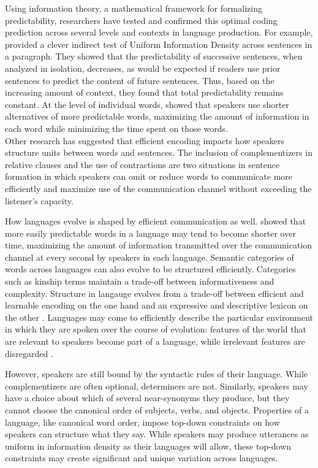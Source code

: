 \documentclass[entropy,article,submit,moreauthors,pdftex]{mdpi}
\begin{document}
Using information theory, a mathematical framework for formalizing
predictability, researchers have tested and confirmed this optimal
coding prediction across several levels and contexts in language
production. For example, \citet{genzel2002} provided a clever indirect
test of Uniform Information Density across sentences in a paragraph.
They showed that the predictability of successive sentences, when
analyzed in isolation, decreases, as would be expected if readers use
prior sentences to predict the content of future sentences. Thus, based
on the increasing amount of context, they found that total
predictability remains constant. At the level of individual words,
\citet{mahowald2013} showed that speakers use shorter alternatives of
more predictable words, maximizing the amount of information in each
word while minimizing the time spent on those words.\\
Other research has suggested that efficient encoding impacts how
speakers structure units between words and sentences. The inclusion of
complementizers in relative clauses \citep{jaeger2010} and the use of
contractions \citep{frank2008} are two situations in sentence formation
in which speakers can omit or reduce words to communicate more
efficiently and maximize use of the communication channel without
exceeding the listener's capacity.

How languages evolve is shaped by efficient communication as well.
\citet{piantadosi2011} showed that more easily predictable words in a
language may tend to become shorter over time, maximizing the amount of
information transmitted over the communication channel at every second
by speakers in each language. Semantic categories of words across
languages can also evolve to be structured efficiently. Categories such
as kinship terms \citep{kemp2012} maintain a trade-off between
informativeness and complexity. Structure in langauge evolves from a
trade-off between efficient and learnable encoding on the one hand and
an expressive and descriptive lexicon on the other \citep{kirby2015}.
Languages may come to efficiently describe the particular environment in
which they are spoken over the course of evolution: features of the
world that are relevant to speakers become part of a language, while
irrelevant features are disregarded \citep{perfors2014}.

However, speakers are still bound by the syntactic rules of their
language. While complementizers are often optional, determiners are not.
Similarly, speakers may have a choice about which of several
near-synonyms they produce, but they cannot choose the canonical order
of subjects, verbs, and objects. Properties of a language, like
canonical word order, impose top-down constraints on how speakers can
structure what they say. While speakers may produce utterances as
uniform in information density as their languages will allow, these
top-down constraints may create significant and unique variation across
languages.
\end{document}
